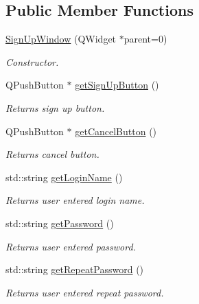 \subsection*{Public Member Functions}
\begin{DoxyCompactItemize}
\item 
\mbox{\hyperlink{class_sign_up_window_aaf6b145da15912da668cd6a4dc380bd5}{Sign\+Up\+Window}} (Q\+Widget $\ast$parent=0)
\begin{DoxyCompactList}\small\item\em Constructor. \end{DoxyCompactList}\item 
\mbox{\label{class_sign_up_window_ad6c8355890f7d68e1594b208c9ff664d}} 
Q\+Push\+Button $\ast$ \mbox{\hyperlink{class_sign_up_window_ad6c8355890f7d68e1594b208c9ff664d}{get\+Sign\+Up\+Button}} ()
\begin{DoxyCompactList}\small\item\em Returns sign up button. \end{DoxyCompactList}\item 
\mbox{\label{class_sign_up_window_a3d2a68bf74ee8ac639117af65dac317a}} 
Q\+Push\+Button $\ast$ \mbox{\hyperlink{class_sign_up_window_a3d2a68bf74ee8ac639117af65dac317a}{get\+Cancel\+Button}} ()
\begin{DoxyCompactList}\small\item\em Returns cancel button. \end{DoxyCompactList}\item 
std\+::string \mbox{\hyperlink{class_sign_up_window_a57f7f4f906052c87ea9b0922e74ca657}{get\+Login\+Name}} ()
\begin{DoxyCompactList}\small\item\em Returns user entered login name. \end{DoxyCompactList}\item 
std\+::string \mbox{\hyperlink{class_sign_up_window_aa12ab939d6f9ff106c0190c2b330259c}{get\+Password}} ()
\begin{DoxyCompactList}\small\item\em Returns user entered password. \end{DoxyCompactList}\item 
std\+::string \mbox{\hyperlink{class_sign_up_window_aaf6fae547c07d475b902e9aa6a2c7749}{get\+Repeat\+Password}} ()
\begin{DoxyCompactList}\small\item\em Returns user entered repeat password. \end{DoxyCompactList}\end{DoxyCompactItemize}


